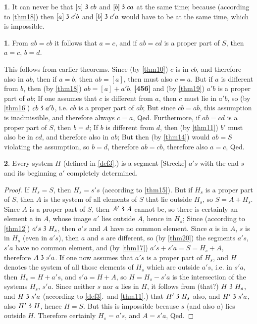 \documentclass[leqno,hidelinks,a4paper]{article}
\theoremstyle{definition}
\newtheorem{satz}{\protect\satzname}
\newtheorem*{zusatz}{\protect\zusatzname}
\newcommand{\satzname}{}
\newcommand{\zusatzname}{}
\renewcommand{\satzname}{\hspace{-4pt}.\ Satz}%
\renewcommand{\zusatzname}{Zusatz}%
\renewcommand{\satzname}{\hspace{-4pt}.\ Theorem}%
\renewcommand{\zusatzname}{Corollary}%
\newcommand\partof{\mathrel{\raisebox{0.45ex}{$\mathfrak{3}$}}}
\begin{document}
\begin{zusatz}
It can never be that $[a] \partof cb$ and $[b] \partof ca$ at the same time; because (according to \ref{thm18}) then $[a] \partof c'b$ and $[b] \partof c'a$ would have to be at the same time, which is impossible.
\end{zusatz}
\begin{satz}\label{thm26}
From $ab=cb$ it follows that $a=c$, and if $ab=cd$ is a proper part of $S$, then $a=c$, $b = d$.
\end{satz}

This follows from earlier theorems.
Since (by \ref{thm10}) $c$ is in $cb$, and therefore also in $ab$, then if $a=b$, then $ab = [a]$, then must also $c=a$.
But if $a$ is different from $b$, then (by \ref{thm18}) $ab = [a]+a'b$, \textbf{[456]} and (by \ref{thm19}) $a'b$ is a proper part of $ab$;
If one assumes that $c$ is different from $a$, then $c$ must lie in $a'b$, so (by \ref{thm16}) $cb \partof a'b$, i.e. $cb$ is a proper part of $ab$;
But since $cb=ab$, this assumption is inadmissible, and therefore always $c=a$, Qed.
Furthermore, if $ab=cd$ is a proper part of $S$, then $b=d$; If $b$ is different from $d$, then (by \ref{thm11}) $b'$ must also be in $cd$, and therefore also in $ab$; But then (by \ref{thm14}) would $ab = S$ violating the assumption, so $b=d$, therefore $ab=cb$, therefore also $a=c$, Qed.

\begin{satz}\label{thm27}
Every system $H$ (defined in \ref{def3}.) is a segment [Strecke] $a's$ with the end $s$ and its beginning $a'$ completely determined.
\end{satz}
\begin{proof}
If $H_s= S$, then $H_s= s's$ (according to \ref{thm15}).
But if $H_s$ is a proper part of $S$, then $A$ is the system of all elements of $S$ that lie outside $H_s$, so $S=A+H_s$.
Since $A$ is a proper part of $S$, then $A' \partof A$ cannot be, so there is certainly an element a in $A$, whose image $a'$ lies outside $A$, hence in $H_s$;
Since (according to \ref{thm12}) $a's \partof H_s$, then $a's$ and $A$ have no common element.
Since $a$ is in $A$, $s$ is in $H_s$ (even in $a's$), then $a$ and $s$ are different, so (by \ref{thm20}) the segments $a's$, $s'a$ have no common element, and (by \ref{thm17}) $a's+  s'a=S=H_s+ A,$ therefore $A \partof s'a$.
If one now assumes that $a's$ is a proper part of $H_s$, and $H$ denotes the system of all those elements of $H_s$ which are outside $a's$, i.e. in $s'a$, then $H_s = H+a's$, and $s'a = H + A$, so $H=H_s-s'a$ is the intersection of the systems $H_s$, $s'a$.
Since neither $s$ nor $a$ lies in $H$, it follows from (that?) $H \partof H_s$, and $H \partof s'a$ (according to \ref{def3}.\ and \ref{thm11}.) that $H' \partof H_s$ also, and $H' \partof s'a$, also $H' \partof H$, hence $H=S$.
But this is impossible because $s$ (and also $a$) lies outside $H$. Therefore certainly $H_s= a's$, and $A=s'a$, Qed.
\end{proof}
\end{document}
